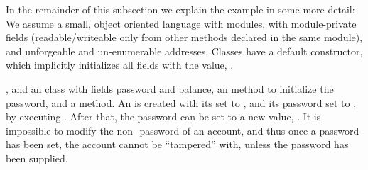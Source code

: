 \vspace{.1cm}

In the remainder of this subsection we   explain the example in some more detail:
We assume a  small, object oriented language with modules, with module-private fields
(readable/writeable only from other methods declared in the same module),  
and unforgeable and un-enumerable addresses.
Classes have a default constructor, which implicitly initializes all fields   with the  value,
.
   


, and an  class with fields  password and  balance, an  method to initialize the password, and  a  method. 
An  is created with its  set to , and its password set to , \eg by executing .
 After that, the password can be set to a new value,  \eg {} . 
It is impossible to modify the  non- password of an account, and thus once a password has been set, the account cannot be ``tampered'' with, unless the password has been supplied.
 

%
%
%
%
% 


